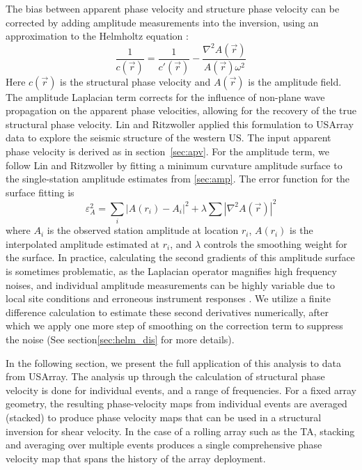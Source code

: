 \documentclass[referee]{gji}
\begin{document}
The bias between apparent phase velocity and structure phase velocity can be corrected by adding amplitude measurements into the inversion, using an approximation to the Helmholtz equation \cite{Wielandt:1993ws,Lin:2011fw}:
\[
\frac{1}{c(\vec{r})} = \frac{1}{c'(\vec{r})} - 
\frac{ \nabla^2 A(\vec{r})}{A(\vec{r}) \omega^2}
\]
Here $c(\vec{r})$ is the structural phase velocity and $A(\vec{r})$ is the amplitude field. The amplitude Laplacian term corrects for the influence of non-plane wave propagation on the apparent phase velocities, allowing for the recovery of the true structural phase velocity. Lin and Ritzwoller  applied this formulation to USArray data to explore the seismic structure of the western US.
The input apparent phase velocity is derived as in section~\ref{sec:apv}.  For the amplitude term, we follow Lin and Ritzwoller  by fitting a minimum curvature amplitude surface to the single-station amplitude estimates from \ref{sec:amp}. The error function for the surface fitting is
\[
\varepsilon_{A}^2 = \sum_i\left|A(r_i)-A_i\right|^2 + \lambda\sum |\nabla^2 A(\vec{r})|^2 
\]
where $A_i$ is the observed station amplitude at location $r_i$, $A(r_i)$ is the interpolated amplitude estimated at $r_i$, and $\lambda$ controls the smoothing weight for the surface. In practice, calculating the second gradients of this amplitude surface is sometimes problematic, as the Laplacian operator magnifies high frequency noises, and individual amplitude measurements can be highly variable due to local site conditions and erroneous instrument responses \cite{Lin:2012la,Eddy:2013la}. We utilize a finite difference calculation to estimate these second derivatives numerically, after which we apply one more step of smoothing on the correction term to suppress the noise (See section\ref{sec:helm_dis} for more details).

In the following section, we present the full application of this analysis to data from USArray. The analysis up through the calculation of structural phase velocity is done for individual events, and a range of frequencies.  For a fixed array geometry, the resulting phase-velocity maps from individual events are averaged (stacked) to produce phase velocity maps that can be used in a structural inversion for shear velocity.  In the case of a rolling array such as the TA, stacking and averaging over multiple events produces a single comprehensive phase velocity map that spans the history of the array deployment.   


\end{document}
